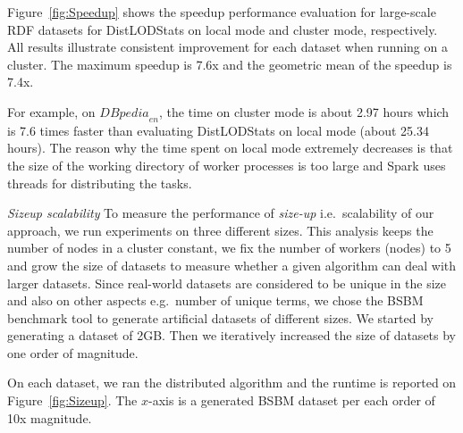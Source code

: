 Figure~\ref{fig:Speedup} shows the speedup performance evaluation for large-scale \gls{RDF} datasets for DistLODStats on local mode and cluster mode, respectively.
All results illustrate consistent improvement for each dataset when running on a cluster. 
The maximum speedup is 7.6x and the geometric mean of the speedup is 7.4x.

For example, on ${DBpedia}_{en}$, the time on cluster mode is about 2.97 hours which is 7.6 times faster than evaluating DistLODStats on local mode (about 25.34 hours). 
The reason why the time spent on local mode extremely decreases is that the size of the working directory of worker processes is too large and Spark uses threads for distributing the tasks.

\textit{Sizeup scalability} 
To measure the performance of \textit{size-up} i.e.~scalability of our approach, we run experiments on three different sizes.
This analysis keeps the number of nodes in a cluster constant, we fix the number of workers (nodes) to 5 and grow the size of datasets to measure whether a given algorithm can deal with larger datasets.
Since real-world datasets are considered to be unique in the size and also on other aspects e.g.~number of unique terms, we chose the BSBM benchmark tool to generate artificial datasets of different sizes.
We started by generating a dataset of 2GB.
Then we iteratively increased the size of datasets by one order of magnitude.

On each dataset, we ran the distributed algorithm and the runtime is reported on Figure~\ref{fig:Sizeup}.
The $x$-axis is a generated BSBM dataset per each order of 10x magnitude.

